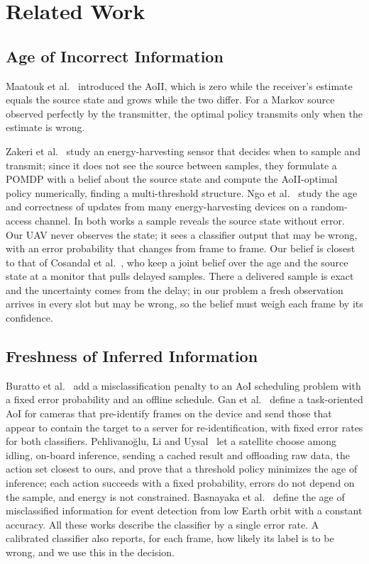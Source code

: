 \documentclass[10pt,journal,compsoc]{IEEEtran}
\theoremstyle{remark}
\begin{document}
\section{Related Work}\label{sec:related}

\subsection{Age of Incorrect Information}
Maatouk et al.~\cite{maatouk2020aoii} introduced the AoII, which is zero while the receiver's estimate equals the source state and grows while the two differ. For a Markov source observed perfectly by the transmitter, the optimal policy transmits only when the estimate is wrong.

Zakeri et al.~\cite{zakeri2023aoiieh} study an energy-harvesting sensor that decides when to sample and transmit; since it does not see the source between samples, they formulate a POMDP with a belief about the source state and compute the AoII-optimal policy numerically, finding a multi-threshold structure. Ngo et al.~\cite{ngo2025eh} study the age and correctness of updates from many energy-harvesting devices on a random-access channel. In both works a sample reveals the source state without error. Our UAV never observes the state; it sees a classifier output that may be wrong, with an error probability that changes from frame to frame. Our belief is closest to that of Cosandal et al.~\cite{cosandal2024joint}, who keep a joint belief over the age and the source state at a monitor that pulls delayed samples. There a delivered sample is exact and the uncertainty comes from the delay; in our problem a fresh observation arrives in every slot but may be wrong, so the belief must weigh each frame by its confidence.


\subsection{Freshness of Inferred Information}
Buratto et al.~\cite{buratto2023misclass} add a misclassification penalty to an AoI scheduling problem with a fixed error probability and an offline schedule. Gan et al.~\cite{gan2025taoi} define a task-oriented AoI for cameras that pre-identify frames on the device and send those that appear to contain the target to a server for re-identification, with fixed error rates for both classifiers. Pehlivano\u{g}lu, Li and Uysal~\cite{pehlivanoglu2026orbit} let a satellite choose among idling, on-board inference, sending a cached result and offloading raw data, the action set closest to ours, and prove that a threshold policy minimizes the age of inference; each action succeeds with a fixed probability, errors do not depend on the sample, and energy is not constrained. Basnayaka et al.~\cite{basnayaka2025aomi} define the age of misclassified information for event detection from low Earth orbit with a constant accuracy. All these works describe the classifier by a single error rate. A calibrated classifier also reports, for each frame, how likely its label is to be wrong, and we use this in the decision.
\end{document}
